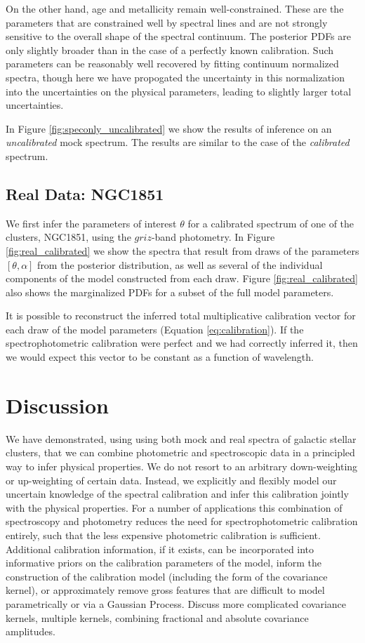\documentclass[iop,numberedappendix]{emulateapj}
\newcommand{\excluster}{NGC1851}
\begin{document}
On the other hand, age and metallicity remain well-constrained.  These
are the parameters that are constrained well by spectral lines and are
not strongly sensitive to the overall shape of the spectral continuum.
The posterior PDFs are only slightly broader than in the case of a
perfectly known calibration. Such parameters can be reasonably well
recovered by fitting continuum normalized spectra, though here we have
propogated the uncertainty in this normalization into the
uncertainties on the physical parameters, leading to slightly larger
total uncertainties.

In Figure \ref{fig:speconly_uncalibrated} we show the results of
inference on an \emph{uncalibrated} mock spectrum.  The results are
similar to the case of the \emph{calibrated} spectrum.


\subsection{Real Data: \excluster} 
We first infer the parameters of interest $\theta$ for a calibrated
spectrum of one of the clusters, \excluster, using the $griz$-band
photometry. In Figure \ref{fig:real_calibrated} we show the spectra
that result from draws of the parameters $[\theta,\alpha]$ from the
posterior distribution, as well as several of the individual
components of the model constructed from each draw. Figure
\ref{fig:real_calibrated} also shows the marginalized PDFs for a
subset of the full model parameters.

It is possible to reconstruct the inferred total multiplicative
calibration vector for each draw of the model parameters (Equation
\ref{eq:calibration}). If the spectrophotometric calibration were
perfect and we had correctly inferred it, then we would expect this
vector to be constant as a function of wavelength.


\section{Discussion}

We have demonstrated, using using both mock and real spectra of
galactic stellar clusters, that we can combine photometric and
spectroscopic data in a principled way to infer physical properties.
We do not resort to an arbitrary down-weighting or up-weighting of
certain data. Instead, we explicitly and flexibly model our uncertain
knowledge of the spectral calibration and infer this calibration
jointly with the physical properties. For a number of applications
this combination of spectroscopy and photometry reduces the need for
spectrophotometric calibration entirely, such that the less expensive
photometric calibration is sufficient.  Additional calibration
information, if it exists, can be incorporated into informative priors
on the calibration parameters of the model, inform the construction of
the calibration model (including the form of the covariance kernel),
or approximately remove gross features that are difficult to model
parametrically or via a Gaussian Process.  {\color{blue} Discuss more
complicated covariance kernels, multiple kernels, combining fractional
and absolute covariance amplitudes.}
\end{document}
